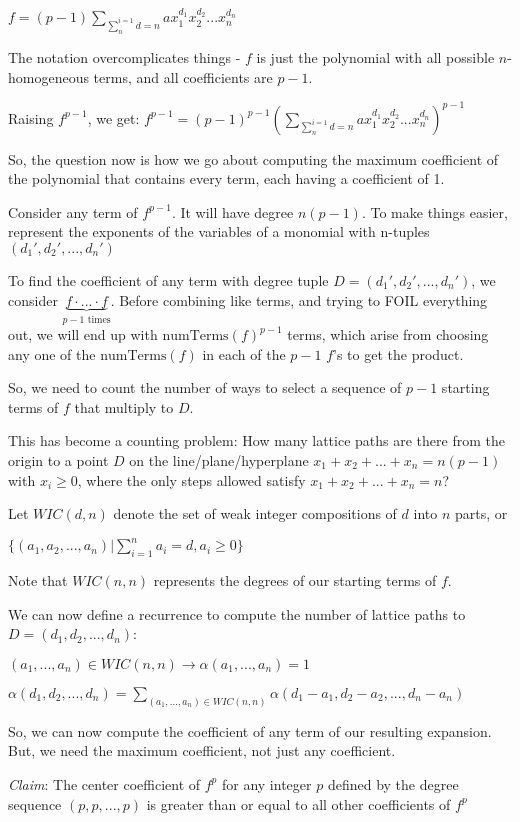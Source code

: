 \documentclass{article}
\begin{document}
$f = (p - 1)\displaystyle\sum_{\sum_{n}^{i = 1}d = n} ax_{1}^{d_1}x_{2}^{d_2}...x_{n}^{d_n}$

The notation overcomplicates things - $f$ is just the polynomial with all possible $n$-homogeneous terms, and all coefficients are $p - 1$.

Raising $f ^ {p - 1}$, we get:
$f ^ {p - 1} = (p - 1)^{p - 1} \left(\displaystyle\sum_{\sum_{n}^{i = 1}d = n} ax_{1}^{d_1}x_{2}^{d_2}...x_{n}^{d_n}\right)^{p - 1}$

So, the question now is how we go about computing the maximum coefficient of the polynomial that contains every term, each having a coefficient of 1.

Consider any term of $f ^ {p - 1}$. It will have degree $n(p - 1)$. To make things easier, represent the exponents of the variables of a monomial with n-tuples $(d_1', d_2', ... , d_n')$

To find the coefficient of any term with degree tuple $D = (d_1', d_2', ... , d_n')$, we consider $\underbrace{f \cdot ... \cdot f}_{p-1 \text{ times}}$. Before combining like terms, and trying to FOIL everything out, we will end up with $\text{numTerms}(f)^{p - 1}$ terms, which arise from choosing any one of the $\text{numTerms}(f)$ in each of the $p-1$ $f$'s to get the product.

So, we need to count the number of ways to select a sequence of $p - 1$ starting terms of $f$ that multiply to $D$.

This has become a counting problem: How many lattice paths are there from the origin to a point $D$ on the line/plane/hyperplane $x_1 + x_2 + ... + x_n = n(p - 1)$ with $x_i \ge 0$, where the only steps allowed satisfy $x_1 + x_2 + ... + x_n = n$?

Let $WIC(d, n)$ denote the set of weak integer compositions of $d$ into $n$ parts, or 

$\lbrace(a_1, a_2, ... , a_n)|\sum_{i = 1}^{n} a_i = d, a_i \ge 0\rbrace$

Note that $WIC(n, n)$ represents the degrees of our starting terms of $f$.

We can now define a recurrence to compute the number of lattice paths to $D = (d_1, d_2, ... , d_n)$:

$(a_1, ... , a_n)\in WIC(n, n) \rightarrow \alpha(a_1, ... , a_n) = 1$

$\alpha(d_1, d_2, ... , d_n) = \displaystyle\sum_{(a_1, ... , a_n)\in WIC(n, n)}\alpha(d_1 - a_1, d_2 - a_2, ... , d_n - a_n)$

So, we can now compute the coefficient of any term of our resulting expansion. But, we need the maximum coefficient, not just any coefficient.

\textit{Claim}: The center coefficient of $f^p$ for any integer $p$ defined by the degree sequence $(p, p, ... , p)$ is greater than or equal to all other coefficients of $f^p$
\end{document}
